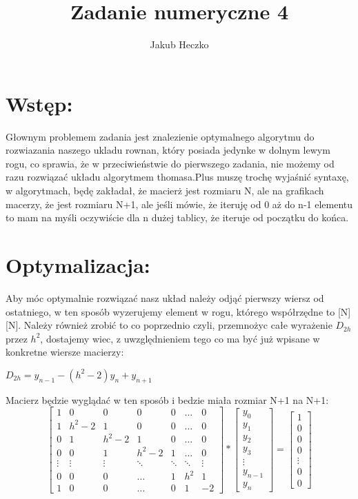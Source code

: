 \documentclass[12pt]{article}
\title{Zadanie numeryczne 4}
\author{Jakub Heczko}
\date{}
\begin{document}
\section{Wstęp:}
Głownym problemem zadania jest znalezienie optymalnego algorytmu do rozwiazania naszego ukladu rownan, który posiada jedynke w dolnym lewym rogu, co sprawia, że w przeciwieństwie do pierwszego zadania, nie możemy od razu rozwiązać układu algorytmem thomasa.Plus muszę trochę wyjaśnić syntaxę, w algorytmach, będę zakładał, że macierż jest rozmiaru N, ale na grafikach macerzy, że jest rozmiaru N+1, ale jeśli mówie, że iteruję od 0 aż do n-1 elementu to mam na myśli oczywiście dla n dużej tablicy, że iteruje od początku do końca.
\section{Optymalizacja:}
Aby móc optymalnie rozwiązać nasz układ należy odjąć pierwszy wiersz od ostatniego, w ten sposób wyzerujemy element w rogu, którego współrzędne to [N][N]. Należy również zrobić to co poprzednio czyli, przemnożyc całe wyrażenie $D_{2h}$ przez $h^{2}$, dostajemy wiec, z uwzględnieniem tego co ma być już wpisane w konkretne wiersze macierzy:
\newline
\begin{center}
    $D_{2h} = y_{n-1} - (h^{2} - 2)y_{n} + y_{n+1}$
\end{center}
Macierz będzie wyglądać w ten sposób i bedzie miała rozmiar N+1 na N+1:
\[
\begin{bmatrix}
    1 & 0 & 0 & 0 & 0 & \dots & 0\\
    1 & h^{2}-2 & 1 & 0 & 0 & \dots & 0\\ 
    0 & 1 & h^{2}-2 & 1 & 0 & \dots & 0\\
    0 & 0 & 1 & h^{2}-2 & 1 &\dots & 0\\
    \vdots & \vdots & \vdots & \ddots & \ddots & \ddots & \vdots\\
    0 & 0 & 0 & \hdots & 1 & h^{2} & 1\\
    1 & 0 & 0 & \hdots & 0 & 1 & -2
\end{bmatrix}
*
\begin{bmatrix}
    y_{0}\\
    y_{1}\\
    y_{2}\\
    y_{3}\\
    \vdots\\
    y_{n-1}\\
    y_{n}
\end{bmatrix}
=
\begin{bmatrix}
    1\\
    0\\
    0\\
    0\\
    \vdots\\
    0\\
    0
\end{bmatrix}
\]
\end{document}
